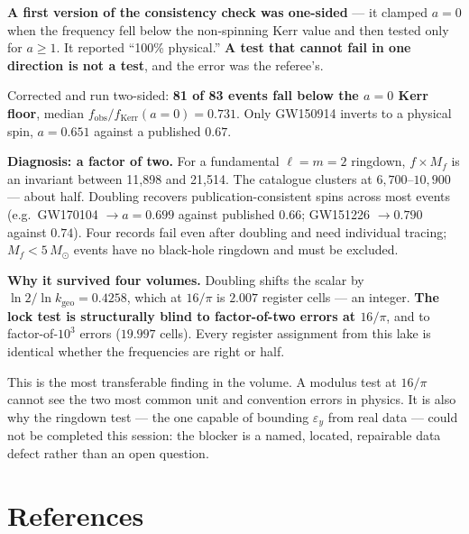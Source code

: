 \documentclass[11pt, letterpaper, openany]{book}
\newcommand{\kgeo}{k_{\mathrm{geo}}}
\begin{document}
\begin{correctionbox}
\textbf{A first version of the consistency check was one-sided} --- it clamped $a = 0$ when the
frequency fell below the non-spinning Kerr value and then tested only for $a \geq 1$. It reported
``100\% physical.'' \textbf{A test that cannot fail in one direction is not a test}, and the error
was the referee's.

\medskip
Corrected and run two-sided: \textbf{81 of 83 events fall below the $a=0$ Kerr floor}, median
$f_{\text{obs}}/f_{\text{Kerr}}(a{=}0) = 0.731$. Only GW150914 inverts to a physical spin,
$a = 0.651$ against a published $0.67$.
\end{correctionbox}

\begin{formbox}
\textbf{Diagnosis: a factor of two.} For a fundamental $\ell=m=2$ ringdown, $f \times M_f$ is an
invariant between 11{,}898 and 21{,}514. The catalogue clusters at $6{,}700$--$10{,}900$ --- about
half. Doubling recovers publication-consistent spins across most events
(e.g.\ GW170104 $\to a = 0.699$ against published $0.66$; GW151226 $\to 0.790$ against $0.74$).
Four records fail even after doubling and need individual tracing;
$M_f < 5\,M_\odot$ events have no black-hole ringdown and must be excluded.

\medskip
\textbf{Why it survived four volumes.} Doubling shifts the scalar by
$\ln 2/\ln\kgeo = 0.4258$, which at $16/\pi$ is $\mathbf{2.007}$ register cells --- an integer.
\textbf{The lock test is structurally blind to factor-of-two errors at $16/\pi$}, and to
factor-of-$10^3$ errors ($19.997$ cells). Every register assignment from this lake is identical
whether the frequencies are right or half.
\end{formbox}

\begin{signalbox}
This is the most transferable finding in the volume. A modulus test at $16/\pi$ cannot see the two
most common unit and convention errors in physics. It is also why the ringdown test --- the one
capable of bounding $\varepsilon_y$ from real data --- could not be completed this session: the
blocker is a named, located, repairable data defect rather than an open question.
\end{signalbox}



\chapter*{References}
\end{document}
